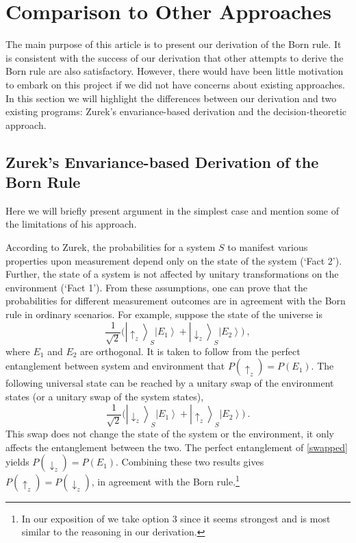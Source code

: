 \documentclass[12pt,onecolumn,secnumarabic,amsmath,amssymb,balancelastpage,nofootinbib]{article}
\newcommand{\ket}[1]{\ensuremath{\left|#1\right\rangle}}
\begin{document}
\section{Comparison to Other Approaches}\label{review}

The main purpose of this article is to present our derivation of the Born rule.  It is consistent with the success of our derivation that other attempts to derive the Born rule are also satisfactory. However, there would have been little motivation to embark on this project if we did not have concerns about existing approaches. In this section we will highlight the differences between our derivation and two existing programs: Zurek's envariance-based derivation and the decision-theoretic approach.

\subsection{Zurek's Envariance-based Derivation of the Born Rule}

Here we will briefly present  \citeyearpar{zurek2005} argument in the simplest case and mention some of the limitations of his approach.

According to Zurek, the probabilities for a system $S$ to manifest various properties upon measurement depend only on the state of the system (`Fact 2').  Further, the state of a system is not affected by unitary transformations on the environment (`Fact 1').  From these assumptions, one can prove that the probabilities for different measurement outcomes are in agreement with the Born rule in ordinary scenarios.  For example, suppose the state of the universe is 
\begin{equation}
\frac{1}{\sqrt{2}}\Big(\ket{\uparrow_z}_S\ket{E_1}+\ket{\downarrow_z}_S\ket{E_2}\Big)\ ,
\end{equation}
where $E_1$ and $E_2$ are orthogonal.  It {is taken to follow} from the perfect entanglement between system and environment that $P(\uparrow_z)=P(E_1)$.  The following universal state can be reached by a unitary swap of the environment states (or a unitary swap of the system states), 
\begin{equation}
\frac{1}{\sqrt{2}}\Big(\ket{\downarrow_z}_S\ket{E_1}+\ket{\uparrow_z}_S\ket{E_2}\Big)\ .
\label{swapped}
\end{equation}
This swap does not change the state of the system or the environment, it only affects the entanglement between the two.  The perfect entanglement of \eqref{swapped} yields $P(\downarrow_z)=P(E_1)$.  Combining these two results gives $P(\uparrow_z)=P(\downarrow_z)$, in agreement with the Born rule.\footnote{In our exposition of \citep[\textsection II.C]{zurek2005} we take option 3 since it seems strongest and is most similar to the reasoning in our derivation.}
\end{document}
